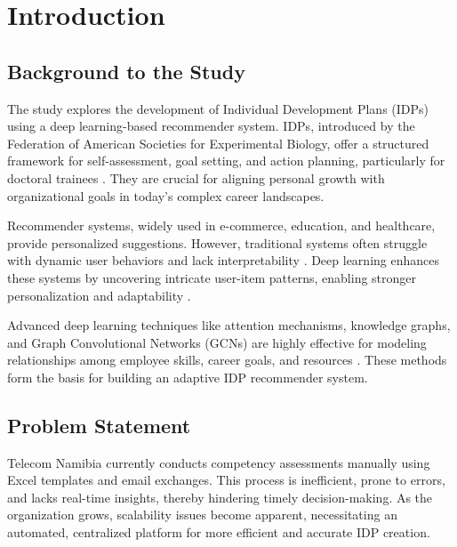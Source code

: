 \chapter{Introduction}
\label{chapter:intro}

\section{Background to the Study}

The study explores the development of Individual Development Plans (IDPs) using a deep learning-based recommender system. IDPs, introduced by the Federation of American Societies for Experimental Biology, offer a structured framework for self-assessment, goal setting, and action planning, particularly for doctoral trainees \cite{vanderford2018cross}. They are crucial for aligning personal growth with organizational goals in today’s complex career landscapes.

Recommender systems, widely used in e-commerce, education, and healthcare, provide personalized suggestions. However, traditional systems often struggle with dynamic user behaviors and lack interpretability \cite{sahoo2019deepreco}. Deep learning enhances these systems by uncovering intricate user-item patterns, enabling stronger personalization and adaptability \cite{mu2018survey, li2024attention}.

Advanced deep learning techniques like attention mechanisms, knowledge graphs, and Graph Convolutional Networks (GCNs) are highly effective for modeling relationships among employee skills, career goals, and resources \cite{li2024attention, chen2024intelligent}. These methods form the basis for building an adaptive IDP recommender system.

\section{Problem Statement}
Telecom Namibia currently conducts competency assessments manually using Excel templates and email exchanges. This process is inefficient, prone to errors, and lacks real-time insights, thereby hindering timely decision-making. As the organization grows, scalability issues become apparent, necessitating an automated, centralized platform for more efficient and accurate IDP creation.

